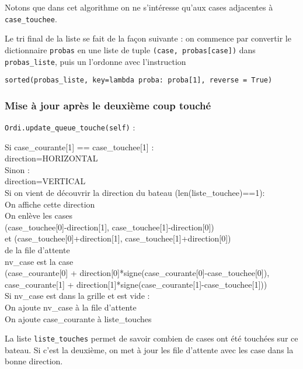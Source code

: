 Notons que dans cet algorithme on ne s'intéresse qu'aux cases adjacentes à \texttt{case\_touchee}.

\medskip

Le tri final de la liste se fait de la façon suivante : on commence par convertir le dictionnaire \texttt{probas} en une liste de tuple \texttt{(case, probas[case])} dans \texttt{probas\_liste}, puis un l'ordonne avec l'instruction
\begin{center}
\texttt{sorted(probas\_liste, key=lambda proba: proba[1], reverse = True)}
\end{center}

\newpage
\subsubsection{Mise à jour après le deuxième coup touché}\label{update_queue_touche}
\texttt{Ordi.update\_queue\_touche(self)} :
\begin{algo1}
Si case\_courante[1] == case\_touchee[1] :\\
direction=HORIZONTAL\\
Sinon :\\
direction=VERTICAL\\
Si on vient de découvrir la direction du bateau (len(liste\_touchee)==1):\\
On affiche cette direction\\
On enlève les cases \\
 (case\_touchee[0]-direction[1], case\_touchee[1]-direction[0])\\ 
et (case\_touchee[0]+direction[1], case\_touchee[1]+direction[0])\\
de la file d'attente\\
nv\_case est la case\\
(case\_courante[0] + direction[0]*signe(case\_courante[0]-case\_touchee[0]),\\
 case\_courante[1] + direction[1]*signe(case\_courante[1]-case\_touchee[1]))\\
Si nv\_case est dans la grille et est vide :\\
On ajoute nv\_case à la file d'attente\\
On ajoute case\_courante à liste\_touches\\
\end{algo1}

La liste \texttt{liste\_touches} permet de savoir combien de cases ont été touchées sur ce bateau. Si c'est la deuxième, on met à jour les file d'attente avec les case dans la bonne direction.

